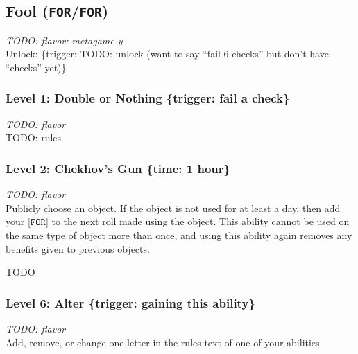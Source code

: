 \documentclass[12pt]{article}
\newcommand{\FOR}{\texttt{FOR}}
\newcommand{\TRIG}[1]{\{trigger: #1\}}
\newcommand{\Class}[4]{\pagebreak\subsection{#1 (#2)}\label{#1}\textit{#3}\\[1mm]Unlock: \TRIG{#4}}
\newcommand{\Skill}[5]{\subsubsection{Level #1: #2 #3}\textit{#4}\\[1mm]#5}
\begin{document}
\Class{Fool}{\FOR/\FOR}
{TODO: flavor: metagame-y}
{TODO: unlock (want to say ``fail 6 checks'' but don't have ``checks'' yet)}

\Skill{1}{Double or Nothing}{\TRIG{fail a check}}
{TODO: flavor}
{TODO: rules}

\Skill{2}{Chekhov's Gun}{\{time: 1 hour\}}
{TODO: flavor}
{Publicly choose an object. If the object is not used for at least a day, then add your [$\FOR$] to the next roll made using the object. This ability cannot be used on the same type of object more than once, and using this ability again removes any benefits given to previous objects.}

TODO

\Skill{6}{Alter}{\TRIG{gaining this ability}}
{TODO: flavor}
{Add, remove, or change one letter in the rules text of one of your abilities.}
\end{document}
